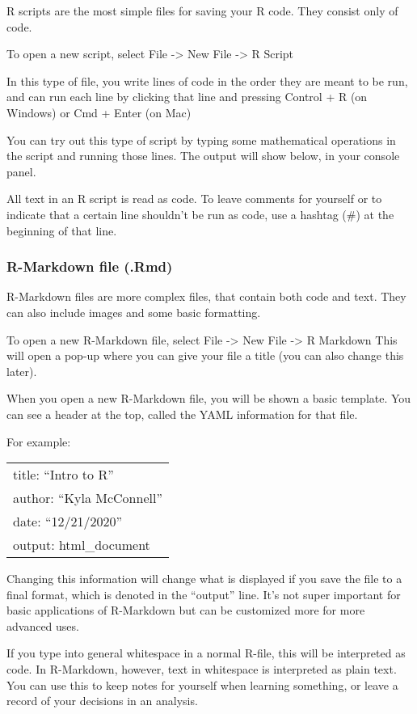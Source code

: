 \documentclass[
]{article}
\begin{document}
R scripts are the most simple files for saving your R code. They consist
only of code.

To open a new script, select File -\textgreater{} New File
-\textgreater{} R Script

In this type of file, you write lines of code in the order they are
meant to be run, and can run each line by clicking that line and
pressing Control + R (on Windows) or Cmd + Enter (on Mac)

You can try out this type of script by typing some mathematical
operations in the script and running those lines. The output will show
below, in your console panel.

All text in an R script is read as code. To leave comments for yourself
or to indicate that a certain line shouldn't be run as code, use a
hashtag (\#) at the beginning of that line.

\hypertarget{r-markdown-file-.rmd}{%
\subsubsection{R-Markdown file (.Rmd)}\label{r-markdown-file-.rmd}}

R-Markdown files are more complex files, that contain both code and
text. They can also include images and some basic formatting.

To open a new R-Markdown file, select File -\textgreater{} New File
-\textgreater{} R Markdown This will open a pop-up where you can give
your file a title (you can also change this later).

When you open a new R-Markdown file, you will be shown a basic template.
You can see a header at the top, called the YAML information for that
file.

For example:

\begin{longtable}[]{@{}l@{}}
\toprule
\endhead
title: ``Intro to R''\tabularnewline
author: ``Kyla McConnell''\tabularnewline
date: ``12/21/2020''\tabularnewline
output: html\_document\tabularnewline
\bottomrule
\end{longtable}

Changing this information will change what is displayed if you save the
file to a final format, which is denoted in the ``output'' line. It's
not super important for basic applications of R-Markdown but can be
customized more for more advanced uses.

If you type into general whitespace in a normal R-file, this will be
interpreted as code. In R-Markdown, however, text in whitespace is
interpreted as plain text. You can use this to keep notes for yourself
when learning something, or leave a record of your decisions in an
analysis.
\end{document}
